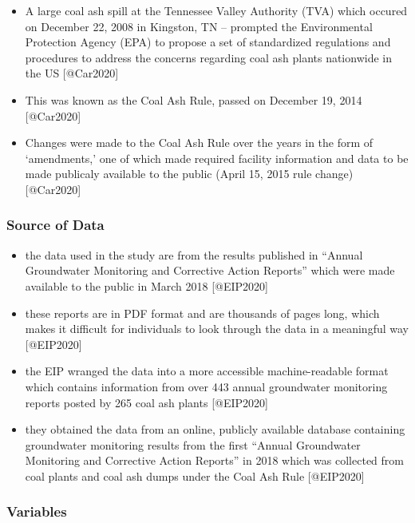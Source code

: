 \documentclass[
]{article}
\begin{document}
\begin{itemize}
\item
  A large coal ash spill at the Tennessee Valley Authority (TVA) which
  occured on December 22, 2008 in Kingston, TN -- prompted the
  Environmental Protection Agency (EPA) to propose a set of standardized
  regulations and procedures to address the concerns regarding coal ash
  plants nationwide in the US {[}@Car2020{]}
\item
  This was known as the Coal Ash Rule, passed on December 19, 2014
  {[}@Car2020{]}
\item
  Changes were made to the Coal Ash Rule over the years in the form of
  `amendments,' one of which made required facility information and data
  to be made publicaly available to the public (April 15, 2015 rule
  change) {[}@Car2020{]}
\end{itemize}

\hypertarget{source-of-data}{%
\subsubsection{Source of Data}\label{source-of-data}}

\begin{itemize}
\item
  the data used in the study are from the results published in ``Annual
  Groundwater Monitoring and Corrective Action Reports'' which were made
  available to the public in March 2018 {[}@EIP2020{]}
\item
  these reports are in PDF format and are thousands of pages long, which
  makes it difficult for individuals to look through the data in a
  meaningful way {[}@EIP2020{]}
\item
  the EIP wranged the data into a more accessible machine-readable
  format which contains information from over 443 annual groundwater
  monitoring reports posted by 265 coal ash plants {[}@EIP2020{]}
\item
  they obtained the data from an online, publicly available database
  containing groundwater monitoring results from the first ``Annual
  Groundwater Monitoring and Corrective Action Reports'' in 2018 which
  was collected from coal plants and coal ash dumps under the Coal Ash
  Rule {[}@EIP2020{]}
\end{itemize}

\hypertarget{variables}{%
\subsubsection{Variables}\label{variables}}
\end{document}
